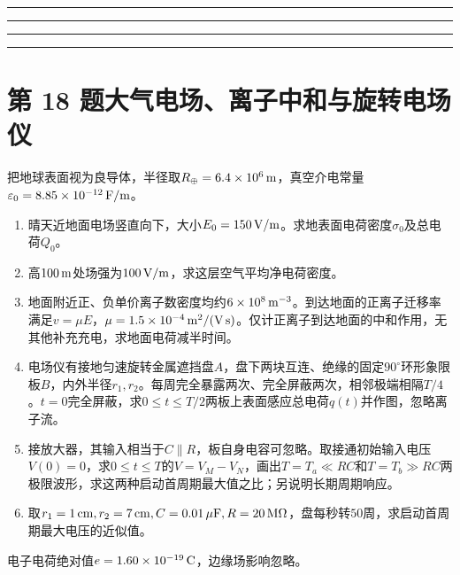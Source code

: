 \documentclass[UTF8,fontset=fandol,a4paper,11pt]{ctexart}
\newcommand{\workarea}{\par\vspace{7mm}\noindent{\small\color{muted}作答区}\par\vspace{4mm}
\noindent\textcolor{rulegray}{\rule{\linewidth}{0.3pt}}\par\vspace{16mm}
\noindent\textcolor{rulegray}{\rule{\linewidth}{0.3pt}}\par\vspace{16mm}
\noindent\textcolor{rulegray}{\rule{\linewidth}{0.3pt}}\par\vspace{16mm}
\noindent\textcolor{rulegray}{\rule{\linewidth}{0.3pt}}}
\begin{document}
\workarea

\clearpage


\section*{第 18 题\quad 大气电场、离子中和与旋转电场仪}\label{q:18}


把地球表面视为良导体，半径取$R_\oplus=6.4\times10^6\,{\rm m}$，真空介电常量$\varepsilon_0=8.85\times10^{-12}\,{\rm F/m}$。
\begin{enumerate}
\item 晴天近地面电场竖直向下，大小$E_0=150\,{\rm V/m}$。求地表面电荷密度$\sigma_0$及总电荷$Q_0$。
\item 高$100\,{\rm m}$处场强为$100\,{\rm V/m}$，求这层空气平均净电荷密度。
\item 地面附近正、负单价离子数密度均约$6\times10^8\,{\rm m^{-3}}$。到达地面的正离子迁移率满足$v=\mu E$，$\mu=1.5\times10^{-4}\,{\rm m^2/(V\,s)}$。仅计正离子到达地面的中和作用，无其他补充充电，求地面电荷减半时间。
\item 电场仪有接地匀速旋转金属遮挡盘$A$，盘下两块互连、绝缘的固定$90^\circ$环形象限板$B$，内外半径$r_1,r_2$。每周完全暴露两次、完全屏蔽两次，相邻极端相隔$T/4$。$t=0$完全屏蔽，求$0\le t\le T/2$两板上表面感应总电荷$q(t)$并作图，忽略离子流。
\item 接放大器，其输入相当于$C\parallel R$，板自身电容可忽略。取接通初始输入电压$V(0)=0$，求$0\le t\le T$的$V=V_M-V_N$，画出$T=T_a\ll RC$和$T=T_b\gg RC$两极限波形，求这两种启动首周期最大值之比；另说明长期周期响应。
\item 取$r_1=1\,{\rm cm},r_2=7\,{\rm cm},C=0.01\,\mu{\rm F},R=20\,{\rm M}\Omega$，盘每秒转$50$周，求启动首周期最大电压的近似值。
\end{enumerate}
电子电荷绝对值$e=1.60\times10^{-19}\,{\rm C}$，边缘场影响忽略。
\end{document}
